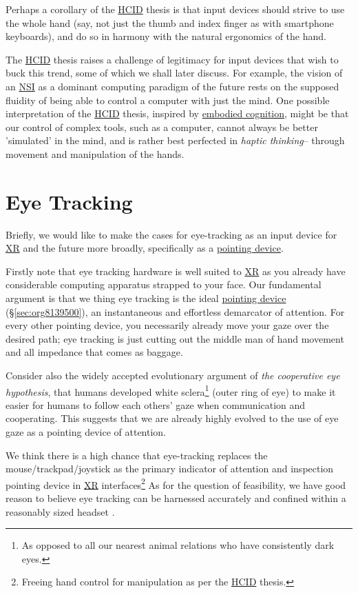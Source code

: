 \documentclass[logo,bsc,singlespacing,parskip]{infthesis}
\begin{document}
Perhaps a corollary of the \hyperref[org30e2275]{HCID} thesis is that input devices should strive to use the whole hand (say, not just the thumb and index finger as with smartphone keyboards), and do so in harmony with the natural ergonomics of the hand.

The \hyperref[org30e2275]{HCID} thesis raises a challenge of legitimacy for input devices that wish to buck this trend, some of which we shall later discuss.
For example, the vision of an \hyperref[org5662848]{NSI} as a dominant computing paradigm of the future rests on the supposed fluidity of being able to control a computer with just the mind.
One possible interpretation of the \hyperref[org30e2275]{HCID} thesis, inspired by \hyperref[org68031b0]{embodied cognition}, might be that our control of complex tools, such as a computer, cannot always be better 'simulated' in the mind, and is rather best perfected in \emph{haptic thinking}-- through movement and manipulation of the hands.

\section{Eye Tracking}
\label{sec:orga7a56b6}
Briefly, we would like to make the cases for eye-tracking as an input device for \hyperref[orgf7f8e78]{XR} and the future more broadly, specifically as a \hyperref[pointing device]{pointing device}.

Firstly note that eye tracking hardware is well suited to \hyperref[orgf7f8e78]{XR} as you already have considerable computing apparatus strapped to your face.
Our fundamental argument is that we thing eye tracking is the ideal \hyperref[sec:org8139500]{pointing device} (\S \ref{sec:org8139500}), an instantaneous and effortless demarcator of attention.
For every other pointing device, you necessarily already move your gaze over the desired path; eye tracking is just cutting out the middle man of hand movement and all impedance that comes as baggage.

Consider also the widely accepted evolutionary argument of \emph{the cooperative eye hypothesis}, that humans developed white sclera\footnote{As opposed to all our nearest animal relations who have consistently dark eyes.} (outer ring of eye) to make it easier for humans to follow each others' gaze when communication and cooperating.
This suggests that we are already highly evolved to the use of eye gaze as a pointing device of attention.

We think there is a high chance that eye-tracking replaces the mouse/trackpad/joystick as the primary indicator of attention and inspection pointing device in \hyperref[orgf7f8e78]{XR} interfaces\footnote{Freeing hand control for manipulation as per the \hyperref[org30e2275]{HCID} thesis.}
As for the question of feasibility, we have good reason to believe eye tracking can be harnessed accurately \autocites{PrecisionGazeMouse}[][]{TobiiGamingNext} and confined within a reasonably sized headset \autocite{VIVEProEye}.
\end{document}
